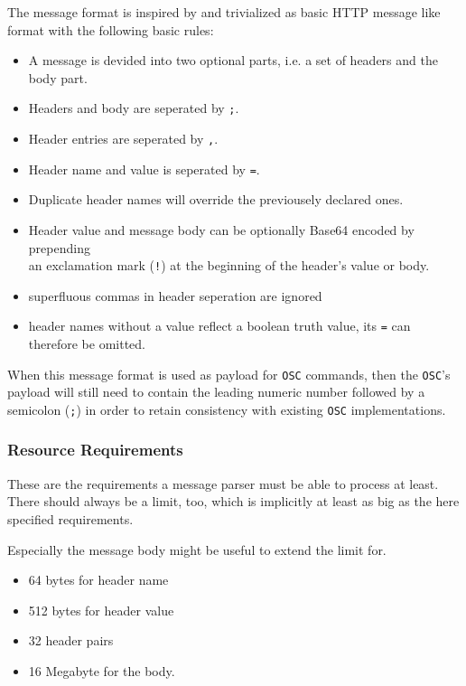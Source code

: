\documentclass[a4paper]{article}
\newcommand{\code}[1]{\colorbox{light-gray}{\texttt{#1}}}
\begin{document}
The message format is inspired by and trivialized as basic HTTP message like
format with the following basic rules:

\begin{itemize}
    \item A message is devided into two optional parts, i.e. a set of headers and the body part.
    \item Headers and body are seperated by \code{;}.
    \item Header entries are seperated by \code{,}.
    \item Header name and value is seperated by \code{=}.
    \item Duplicate header names will override the previousely declared ones.
    \item Header value and message body can be optionally Base64 encoded by prepending \\
        an exclamation mark (\code{!}) at the beginning of the header's value or body.
    \item superfluous commas in header seperation are ignored
    \item header names without a value reflect a boolean truth value,
        its \code{=} can therefore be omitted.
\end{itemize}

When this message format is used as payload for \code{OSC} commands, then
the \code{OSC}'s payload will still need to contain the leading numeric
number followed by a semicolon (\code{;}) in order to retain consistency
with existing \code{OSC} implementations.

\subsubsection*{Resource Requirements}

These are the requirements a message parser must be able to process at least.
There should always be a limit, too, which is implicitly at least as big as
the here specified requirements.

Especially the message body might be useful to extend the limit for.

\begin{itemize}
    \item 64 bytes for header name
    \item 512 bytes for header value
    \item 32 header pairs
    \item 16 Megabyte for the body.
\end{itemize}
\end{document}
